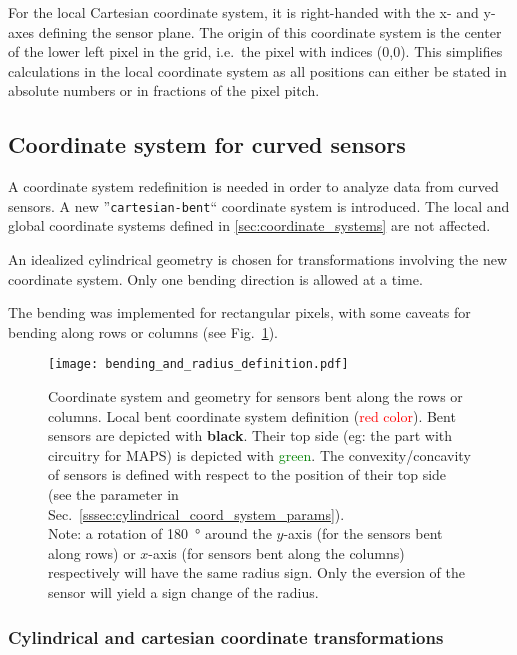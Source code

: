 For the local Cartesian coordinate system, it is right-handed with the x- and y-axes defining the sensor plane.  The origin of this coordinate system is the center of the lower left pixel in the grid, i.e.\ the pixel with indices (0,0).  This simplifies calculations in the local coordinate system as all positions can either be stated in absolute numbers or in fractions of the pixel pitch.

\subsection{Coordinate system for curved sensors}
\label{ssec:bentdetectors}

A coordinate system redefinition is needed in order to analyze data from curved sensors. A new ''\texttt{cartesian-bent}`` coordinate system is introduced. The local and global coordinate systems defined in \ref{sec:coordinate_systems} are not affected.

An idealized cylindrical geometry is chosen for transformations involving the new coordinate system. Only one bending direction is allowed at a time.

The bending was implemented for rectangular pixels, with some caveats for bending along rows or columns (see Fig.~\ref{fig:bent_coord_syst}). 


\begin{figure}[!htp]
\centering
  \texttt{[image: bending\_and\_radius\_definition.pdf]}
  \caption{Coordinate system and geometry for sensors bent along the rows or columns. Local bent coordinate system definition (\textcolor{red}{red color}). Bent sensors are depicted with \textbf{black}. Their top side (eg: the part with circuitry for MAPS) is depicted with \textcolor{green}{green}. The convexity/concavity of sensors is defined with respect to the position of their top side (see the parameter \protect{} in Sec.~\ref{sssec:cylindrical_coord_system_params}). \\ Note: a rotation of \SI{180}{\degree} around the $y$-axis (for the sensors bent along rows) or $x$-axis (for sensors bent along the columns) respectively will have the same radius sign. Only the eversion of the sensor will yield a sign change of the radius.}
\label{fig:bent_coord_syst}
\end{figure}


\subsubsection{Cylindrical and cartesian coordinate transformations}
\label{sssec:cylindrical_coord_transformations}

